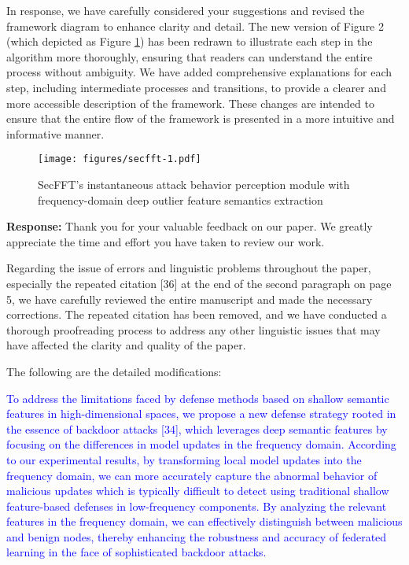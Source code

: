 \documentclass[a4paper,twoside,11pt,dvipsnames]{reviewresponse}
\begin{document}
In response, we have carefully considered your suggestions and revised the framework diagram to enhance clarity and detail. The new version of Figure 2 (which depicted as Figure \ref{fig2:instant}) has been redrawn to illustrate each step in the algorithm more thoroughly, ensuring that readers can understand the entire process without ambiguity. We have added comprehensive explanations for each step, including intermediate processes and transitions, to provide a clearer and more accessible description of the framework. These changes are intended to ensure that the entire flow of the framework is presented in a more intuitive and informative manner.

\begin{figure}[!h]
    \centering
    \texttt{[image: figures/secfft-1.pdf]}
    \caption{SecFFT's instantaneous attack behavior perception module with frequency-domain deep outlier feature semantics extraction}
    \label{fig2:instant}
\end{figure}


\textbf{Response:} Thank you for your valuable feedback on our paper. We greatly appreciate the time and effort you have taken to review our work.

Regarding the issue of errors and linguistic problems throughout the paper, especially the repeated citation [36] at the end of the second paragraph on page 5, we have carefully reviewed the entire manuscript and made the necessary corrections. The repeated citation has been removed, and we have conducted a thorough proofreading process to address any other linguistic issues that may have affected the clarity and quality of the paper.

The following are the detailed modifications:

\textcolor{blue}{
To address the limitations faced by defense methods based on shallow semantic features in high-dimensional spaces, we propose a new defense strategy rooted in the essence of backdoor attacks [34], which leverages deep semantic features by focusing on the differences in model updates in the frequency domain. According to our experimental results, by transforming local model updates into the frequency domain, we can more accurately capture the abnormal behavior of malicious updates which is typically difficult to detect using traditional shallow feature-based defenses in low-frequency components. By analyzing the relevant features in the frequency domain, we can effectively distinguish between malicious and benign nodes, thereby enhancing the robustness and accuracy of federated learning in the face of sophisticated backdoor attacks.
}
\end{document}
